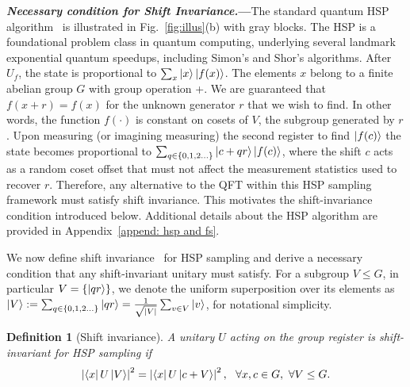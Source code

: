 \documentclass[reprint, aps, prl, superscriptaddress]{revtex4-2}
\newcommand{\rev}[1]{\textcolor{revisioncolor}{#1}}
\renewcommand{\section}[1]{\par\medskip\noindent\textbf{{\textit{#1.}---}}}
\newtheorem{definition}{Definition}
\begin{document}
\section{Necessary condition for Shift Invariance}The standard quantum HSP algorithm~\cite{Shor1994, Shor1997, Simon1997, Jozsa2001} is illustrated in Fig.~\ref{fig:illus}(b) with gray blocks. \rev{The HSP is a foundational problem class in quantum computing, underlying several landmark exponential quantum speedups, including Simon's and Shor's algorithms.} After $U_f$, the state is proportional to $\sum_x \ket{x}\ket{f(x)}$. The elements $x$ belong to a finite abelian group $G$ with group operation +. We are guaranteed that $f(x+r)=f(x)$ for the unknown generator $r$ that we wish to find. In other words, the function $f(\cdot)$ is constant on cosets of $V$, the subgroup generated by $r$. Upon measuring (or imagining measuring) the second register to find $\ket{f(c)}$ the state becomes proportional to $\sum_{q\in \{0,1,2...\}} \ket{c+qr}\ket{f(c)}$, \rev{where the shift $c$ acts as a random coset offset that must not affect the measurement statistics used to recover $r$. Therefore, any alternative to the QFT within this HSP sampling framework must satisfy shift invariance. This motivates the shift-invariance condition introduced below. Additional details about the HSP algorithm are provided in Appendix~\ref{append: hsp and fs}.}


We now define shift invariance~\cite{NielsenChuang2000} for HSP sampling and derive a necessary condition that any shift-invariant unitary must satisfy. For a subgroup $V \le G$, in particular $V=\{\ket{qr}\}$, we denote the uniform superposition over its elements as $\ket{V} := \sum_{q\in \{0,1,2...\}} \ket{qr}  = \frac{1}{\sqrt{|V|}} \sum_{v \in V} \ket{v}$, for notational simplicity.

\begin{definition}[Shift invariance]
    A unitary $U$ acting on the group register is shift-invariant for HSP sampling if
    \begin{equation}
    \label{eq:shift invariant def}
        \left|\bra{x}U\ket{V}\right|^2
        =
        \left|\bra{x}U \ket{c+V}\right|^2,
        ~~
        \forall x,c \in G,\ \forall V \le G.
    \end{equation}
\end{definition}
\end{document}
